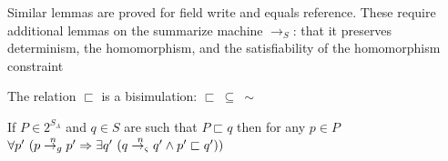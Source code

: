 %
%
%

Similar lemmas are proved for field write and equals reference. These
require additional lemmas on the summarize machine
$\rightarrow_S$: that it preserves determinism, the
homomorphism, and the satisfiability of the homomorphism constraint

\begin{theorem}
\label{th:bisim}
The relation $\sqsubset$ is a bisimulation: $\sqsubset\ \subseteq\ \sim$
\end{theorem}


\begin{corollary}
If $P \in 2^{S_\mathit{A}}$ and $q \in S$ are such that $P \sqsubset q$ then for any $p \in P$
$\forall p^\prime\ (p \stackrel{n}{\rightarrow_{g}} p^\prime \Rightarrow \exists q^\prime\ (q \stackrel{n}{\rightarrow_{\varsigma}} q^\prime \wedge p^\prime \sqsubset q^\prime))$
\end{corollary}

